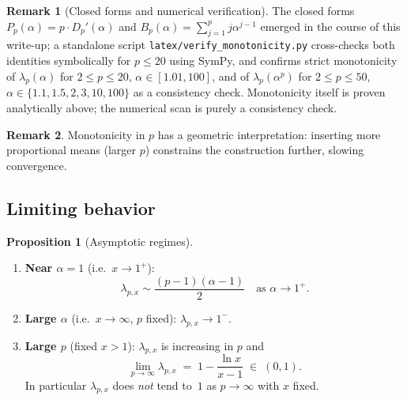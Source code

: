 \documentclass[11pt,a4paper]{article}
\theoremstyle{definition}
\newtheorem{proposition}{Proposition}[section]
\newtheorem{remark}{Remark}[section]
\begin{document}
\begin{remark}[Closed forms and numerical verification]
The closed forms $P_p(\alpha) = p \cdot D_p'(\alpha)$ and $B_p(\alpha) = \sum_{j=1}^p j\alpha^{j-1}$ emerged in the course of this write-up; a standalone script \texttt{latex/verify\_monotonicity.py} cross-checks both identities symbolically for $p \leq 20$ using SymPy, and confirms strict monotonicity of $\lambda_p(\alpha)$ for $2 \leq p \leq 20$, $\alpha \in [1.01, 100]$, and of $\lambda_p(\alpha^p)$ for $2 \leq p \leq 50$, $\alpha \in \{1.1, 1.5, 2, 3, 10, 100\}$ as a consistency check. Monotonicity itself is proven analytically above; the numerical scan is purely a consistency check.
\end{remark}

\begin{remark}
Monotonicity in $p$ has a geometric interpretation: inserting more proportional means (larger $p$) constrains the construction further, slowing convergence.
\end{remark}

\subsection{Limiting behavior}

\begin{proposition}[Asymptotic regimes]
\label{prop:limits}
\mbox{}
\begin{enumerate}
  \item \textbf{Near $\alpha = 1$} (i.e.\ $x \to 1^+$):
  \[
    \lambda_{p,x} \sim \frac{(p-1)(\alpha - 1)}{2} \quad \text{as } \alpha \to 1^+.
  \]
  \item \textbf{Large $\alpha$} (i.e.\ $x \to \infty$, $p$ fixed): $\lambda_{p,x} \to 1^-$.
  \item \textbf{Large $p$} (fixed $x > 1$): $\lambda_{p,x}$ is increasing in $p$ and
  \[
    \lim_{p \to \infty} \lambda_{p,x} \;=\; 1 - \frac{\ln x}{x - 1}
     \;\in\; (0, 1).
  \]
  In particular $\lambda_{p,x}$ does \emph{not} tend to~$1$ as $p \to \infty$ with $x$ fixed.
\end{enumerate}
\end{proposition}
\end{document}
